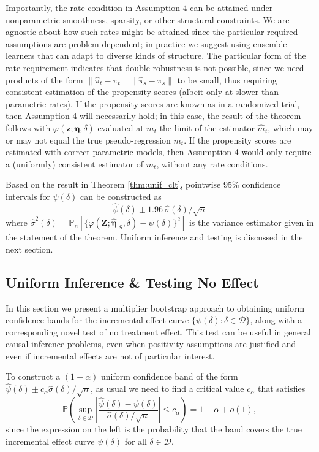 \documentclass[12pt]{article}
\newcommand{\Pb}{\mathbb{P}}
\newcommand{\Pn}{\mathbb{P}_n}
\newcommand{\bZ}{\mathbf{Z}}
\newcommand{\bz}{\mathbf{z}}
\theoremstyle{remark}
\begin{document}
Importantly, the rate condition in Assumption 4 can be attained under nonparametric smoothness, sparsity, or other structural constraints. We are agnostic about how such rates might be attained since the particular required assumptions are problem-dependent; in practice we suggest using ensemble learners that can adapt to diverse kinds of structure. The particular form of the rate requirement indicates that double robustness is not possible, since we need products of the form $\| \hat\pi_t - \pi_t \| \| \hat\pi_s - \pi_s \|$ to be small, thus requiring consistent estimation of the propensity scores (albeit only at slower than parametric rates). If the propensity scores are known as in a randomized trial, then Assumption 4 will necessarily hold; in this case, the result of the theorem follows with $\varphi(\bz;\boldsymbol\eta,\delta)$ evaluated at $\overline{m}_t$ the limit of the estimator $\hat{m}_t$, which may or may not equal the true pseudo-regression $m_t$. If the propensity scores are estimated with correct parametric models, then Assumption 4 would only require a (uniformly) consistent estimator of $m_t$, without any rate conditions.

Based on the result in Theorem \ref{thm:unif_clt}, pointwise 95\% confidence intervals for $\psi(\delta)$ can be constructed as
$$ \hat\psi(\delta) \pm 1.96 \ \hat\sigma(\delta) / \sqrt{n} $$
where $\hat\sigma^2(\delta) = \Pn[\{\varphi(\bZ;\hat{\boldsymbol\eta}_{\text{-}S},\delta)-\hat\psi(\delta)\}^2]$ is the variance estimator given in the statement of the theorem. Uniform inference and testing is discussed in the next section.

\subsection{Uniform Inference \& Testing No Effect}
\label{sec:test}

In this section we present a multiplier bootstrap approach to obtaining uniform confidence bands for the incremental effect curve $\{\psi(\delta) : \delta \in \mathcal{D} \}$, along with a corresponding novel test of no treatment effect. This test can be useful in general causal inference problems, even when positivity assumptions are justified and even if incremental effects are not of particular interest.

To construct a $(1-\alpha)$ uniform confidence band of the form $ \hat\psi(\delta) \pm c_\alpha \hat\sigma(\delta) / \sqrt{n} $, as usual we need to find a critical value $c_\alpha$ that satisfies
$$ %
\Pb\left( \sup_{\delta \in \mathcal{D}} \left| \frac{\hat\psi(\delta) - \psi(\delta)}{\hat\sigma(\delta)/\sqrt{n}} \right| \leq {c}_\alpha \right) = 1-\alpha + o(1), $$
since the expression on the left is the probability that the band covers the true incremental effect curve $\psi(\delta)$ for all $\delta \in \mathcal{D}$. 
\end{document}
